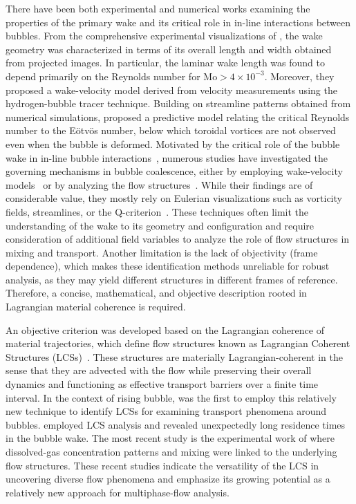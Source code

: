 \documentclass[aps,prfluids,reprint,nofootinbib,onecolumn,groupedaddress,showkeys]{revtex4-2}
\begin{document}
	There have been both experimental and numerical works examining the properties of the primary wake and its critical role in in-line interactions between bubbles. From the comprehensive experimental visualizations of \citet{Bhaga1981,Bhaga1980Exp}, the wake geometry was characterized in terms of its overall length and width obtained from projected images. In particular, the laminar wake length was found to depend primarily on the Reynolds number for $\mathrm{Mo} > 4\times10^{-3}$. Moreover, they proposed a wake-velocity model derived from velocity measurements using the hydrogen-bubble tracer technique. Building on streamline patterns obtained from numerical simulations, \citet{Monica2016} proposed a predictive model relating the critical Reynolds number to the Eötvös number, below which toroidal vortices are not observed even when the bubble is deformed. Motivated by the critical role of the bubble wake in in-line bubble interactions~\cite{Yuan1994,HALLEZ2011,Gumulya2017}, numerous studies have investigated the governing mechanisms in bubble coalescence, either by employing wake-velocity models~\cite{Narayanan1974,Zhang2003,Ramirez2014} or by analyzing the flow structures~\cite{Brucker1999,Smolianski2005,Kusuno2021}. While their findings are of considerable value, they mostly rely on Eulerian visualizations such as vorticity fields, streamlines, or the Q-criterion~\cite{Senapati2019,Zhao2024}. These techniques often limit the understanding of the wake to its geometry and configuration and require consideration of additional field variables to analyze the role of flow structures in mixing and transport. Another limitation is the lack of objectivity (frame dependence), which makes these identification methods unreliable for robust analysis, as they may yield different structures in different frames of reference. Therefore, a concise, mathematical, and objective description rooted in Lagrangian material coherence is required.
	
	An objective criterion was developed based on the Lagrangian coherence of material trajectories, which define flow structures known as Lagrangian Coherent Structures (LCSs)~\cite{Haller2015}. These structures are materially Lagrangian-coherent in the sense that they are advected with the flow while preserving their overall dynamics and functioning as effective transport barriers over a finite time interval. In the context of rising bubble, \citet{Ming2017} was the first to employ this relatively new technique to identify LCSs for examining transport phenomena around bubbles. \citet{Kameke2019} employed LCS analysis and revealed unexpectedly long residence times in the bubble wake. The most recent study is the experimental work of \citet{Kursula2022} where dissolved-gas concentration patterns and mixing were linked to the underlying flow structures. These recent studies indicate the versatility of the LCS in uncovering diverse flow phenomena and emphasize its growing potential as a relatively new approach for multiphase-flow analysis.
	
\end{document}
